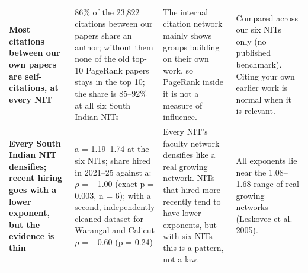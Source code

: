 \begin{tabular}{@{}p{2.5cm}p{4.4cm}p{4.5cm}p{5.4cm}@{}}
\addlinespace[1.5pt]
\textbf{Most citations between our own papers are self-citations, at every NIT} & 86\% of the 23,822 citations between our papers share an author; without them none of the old top-10 PageRank papers stays in the top 10; the share is 85--92\% at all six South Indian NITs & The internal citation network mainly shows groups building on their own work, so PageRank inside it is not a measure of influence. & Compared across our six NITs only (no published benchmark). Citing your own earlier work is normal when it is relevant. \\
\addlinespace[1.5pt]
\textbf{Every South Indian NIT densifies; recent hiring goes with a lower exponent, but the evidence is thin} & a = 1.19--1.74 at the six NITs; share hired in 2021--25 against a: $\rho$ = $-$1.00 (exact p = 0.003, n = 6); with a second, independently cleaned dataset for Warangal and Calicut $\rho$ = $-$0.60 (p = 0.24) & Every NIT's faculty network densifies like a real growing network. NITs that hired more recently tend to have lower exponents, but with six NITs this is a pattern, not a law. & All exponents lie near the 1.08--1.68 range of real growing networks (Leskovec et al. 2005). \\
\bottomrule
\end{tabular}
